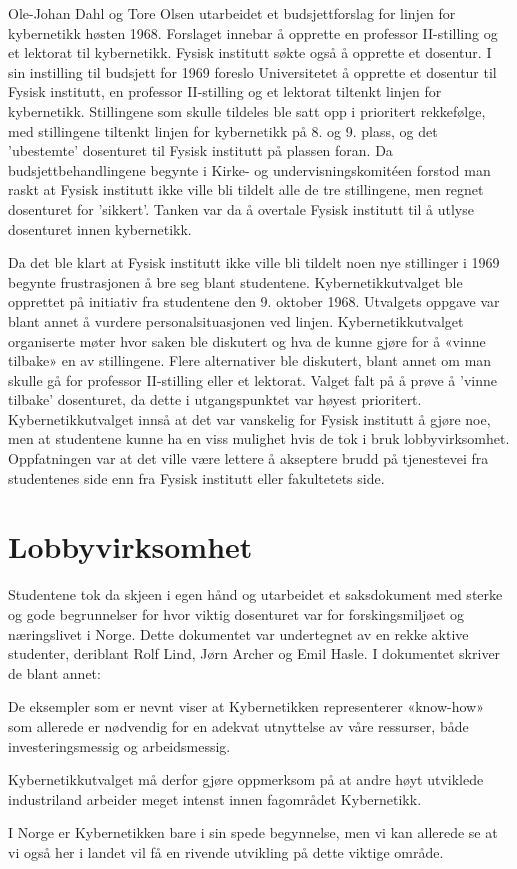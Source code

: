 Ole-Johan Dahl og Tore Olsen utarbeidet et budsjettforslag for linjen for kybernetikk høsten 1968. Forslaget innebar å opprette en professor II-stilling og et lektorat til kybernetikk. Fysisk institutt søkte også å opprette et dosentur. I sin instilling til budsjett for 1969 foreslo Universitetet å opprette et dosentur til Fysisk institutt, en professor II-stilling og et lektorat tiltenkt linjen for kybernetikk. Stillingene som skulle tildeles ble satt opp i prioritert rekkefølge, med stillingene tiltenkt linjen for kybernetikk på 8. og 9. plass, og det 'ubestemte' dosenturet til Fysisk institutt på plassen foran. Da budsjettbehandlingene begynte i Kirke- og undervisningskomitéen forstod man raskt at Fysisk institutt ikke ville bli tildelt alle de tre stillingene, men regnet dosenturet for 'sikkert'. Tanken var da å overtale Fysisk institutt til å utlyse dosenturet innen kybernetikk.

Da det ble klart at Fysisk institutt ikke ville bli tildelt noen nye stillinger i 1969 begynte frustrasjonen å bre seg blant studentene. Kybernetikkutvalget ble opprettet på initiativ fra studentene den 9. oktober 1968. Utvalgets oppgave var blant annet å vurdere personalsituasjonen ved linjen. Kybernetikkutvalget organiserte møter hvor saken ble diskutert og hva de kunne gjøre for å «vinne tilbake» en av stillingene. Flere alternativer ble diskutert, blant annet om man skulle gå for professor II-stilling eller et lektorat. Valget falt på å prøve å 'vinne tilbake' dosenturet, da dette i utgangspunktet var høyest prioritert. Kybernetikkutvalget innså at det var vanskelig for Fysisk institutt å gjøre noe, men at studentene kunne ha en viss mulighet hvis de tok i bruk lobbyvirksomhet. Oppfatningen var at det ville være lettere å akseptere brudd på tjenestevei fra studentenes side enn fra Fysisk institutt eller fakultetets side.

\section{Lobbyvirksomhet}

Studentene tok da skjeen i egen hånd og utarbeidet et saksdokument med sterke og gode begrunnelser for hvor viktig dosenturet var for forskingsmiljøet og næringslivet i Norge. Dette dokumentet var undertegnet av en rekke aktive studenter, deriblant Rolf Lind, Jørn Archer og Emil Hasle. I dokumentet skriver de blant annet:

\begin{displayquote}
	De eksempler som er nevnt viser at Kybernetikken representerer «know-how» som allerede er nødvendig for en adekvat utnyttelse av våre ressurser, både investeringsmessig og arbeidsmessig.

	Kybernetikkutvalget må derfor gjøre oppmerksom på at andre høyt utviklede industriland arbeider meget intenst innen fagområdet Kybernetikk.

	I Norge er Kybernetikken bare i sin spede begynnelse, men vi kan allerede se at vi også her i landet vil få en rivende utvikling på dette viktige område.
\end{displayquote}

